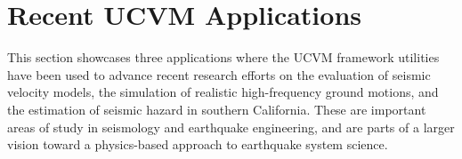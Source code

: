
\section{Recent UCVM Applications}

This section showcases three applications where the UCVM framework utilities have been used to advance recent research efforts on the evaluation of seismic velocity models, the simulation of realistic high-frequency ground motions, and the estimation of seismic hazard in southern California. These are important areas of study in seismology and earthquake engineering, and are parts of a larger vision toward a physics-based approach to earthquake system science.












